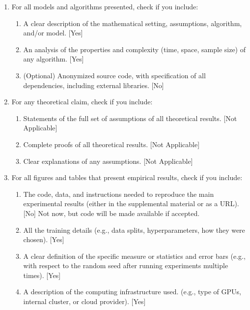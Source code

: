 \documentclass[twoside]{article}
\begin{document}
 \begin{enumerate}


 \item For all models and algorithms presented, check if you include:
 \begin{enumerate}
   \item A clear description of the mathematical setting, assumptions, algorithm, and/or model. [Yes]
   \item An analysis of the properties and complexity (time, space, sample size) of any algorithm. [Yes]
   \item (Optional) Anonymized source code, with specification of all dependencies, including external libraries. [No]
 \end{enumerate}


 \item For any theoretical claim, check if you include:
 \begin{enumerate}
   \item Statements of the full set of assumptions of all theoretical results. [Not Applicable]
   \item Complete proofs of all theoretical results. [Not Applicable]
   \item Clear explanations of any assumptions. [Not Applicable]   
 \end{enumerate}


 \item For all figures and tables that present empirical results, check if you include:
 \begin{enumerate}
   \item The code, data, and instructions needed to reproduce the main experimental results (either in the supplemental material or as a URL). [No] Not now, but code will be made available if accepted.
   \item All the training details (e.g., data splits, hyperparameters, how they were chosen). [Yes]
         \item A clear definition of the specific measure or statistics and error bars (e.g., with respect to the random seed after running experiments multiple times). [Yes]
         \item A description of the computing infrastructure used. (e.g., type of GPUs, internal cluster, or cloud provider). [Yes]
 \end{enumerate}


\end{enumerate}
\end{document}
